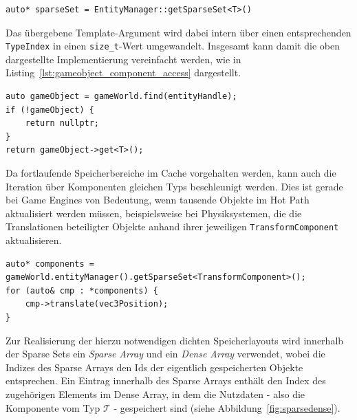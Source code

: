 \begin{verbatim}
auto* sparseSet = EntityManager::getSparseSet<T>()
\end{verbatim}

\noindent
Das übergebene Template-Argument wird dabei intern über einen entsprechenden \texttt{TypeIndex} in einen \texttt{size\_t}-Wert umgewandelt.
Insgesamt kann damit die oben dargestellte Implementierung vereinfacht werden, wie in Listing~\ref{lst:gameobject_component_access} dargestellt.

\vspace{5mm}
\begin{lstlisting}[style=c++style,
caption={Zugriff auf eine Komponente eines GameObjects mit der ECS-Implementierung in \textit{helios} (Meilenstein 5).},
label=lst:gameobject_component_access]
auto gameObject = gameWorld.find(entityHandle);
if (!gameObject) {
    return nullptr;
}
return gameObject->get<T>();
\end{lstlisting}
\vspace{5mm}

Da fortlaufende Speicherbereiche im Cache vorgehalten werden, kann auch die Iteration über Komponenten gleichen Typs beschleunigt werden.
Dies ist gerade bei Game Engines von Bedeutung, wenn tausende Objekte im Hot Path aktualisiert werden müssen, beispielsweise bei Physiksystemen, die die Translationen beteiligter Objekte anhand ihrer jeweiligen \texttt{TransformComponent} aktualisieren.

\vspace{5mm}
\begin{lstlisting}[style=c++style,
caption={Codebeispiel für die Iteration über ein komponententypspezifisches Sparse Set.},
label=lst:gameobject_transform_component]
auto* components = gameWorld.entityManager().getSparseSet<TransformComponent>();
for (auto& cmp : *components) {
    cmp->translate(vec3Position);
}
\end{lstlisting}
\vspace{5mm}

Zur Realisierung der hierzu notwendigen dichten Speicherlayouts wird innerhalb der Sparse Sets ein \textit{Sparse Array} und ein \textit{Dense Array} verwendet, wobei die Indizes des Sparse Arrays den Ids der eigentlich gespeicherten Objekte entsprechen.
Ein Eintrag innerhalb des Sparse Arrays enthält den Index des zugehörigen Elements im Dense Array, in dem die Nutzdaten - also die Komponente vom Typ $\mathcal{T}$ - gespeichert sind (siehe Abbildung~\ref{fig:sparsedense}).

